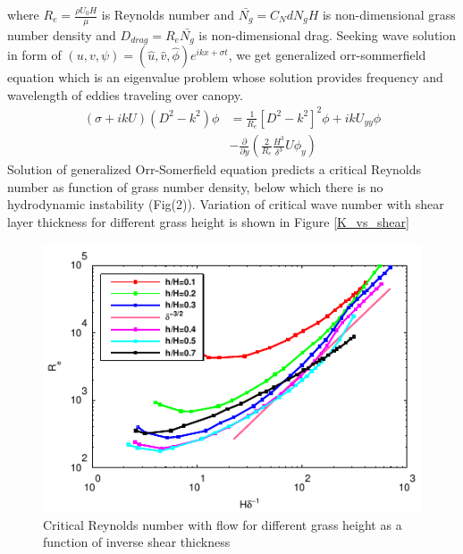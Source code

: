 \documentclass[aps,prl,twocolumn,showpacs,superscriptaddress,groupedaddress,10pt]{revtex4-1}  %
\newcommand{\del}{\partial}
\begin{document}
where $R_{e}= \frac{\rho U_0 H}{\mu}$ is Reynolds number and $\bar{N_g} = C_N d N_g H$ is non-dimensional grass number density and  $D_{drag} = R_{e}\bar{N_{g}}$ is 
non-dimensional drag. Seeking wave solution in form of $\left(u,v,\psi \right)= \left(\hat u, \hat v, \hat\phi \right)e^{ikx+\sigma t}$, we get generalized orr-sommerfield equation 
which is an eigenvalue problem whose solution provides frequency and wavelength of eddies traveling over canopy.
\small
\begin{equation}
\begin{split}
\left(\sigma+ikU\right) \left(D^2-k^2\right)\phi &= \frac{1}{R_{e}}\left[D^2 -k^{2} \right]^2\phi +ikU_{yy}\phi \\
&-\frac{\del}{\del y}\left(\frac{2}{R_e}\frac{H^3}{\delta^3}U\phi_y\right)
\label{Orr-somerfield}
\end{split}
\end{equation}
\normalsize
Solution of generalized Orr-Somerfield equation predicts a critical Reynolds number as function of grass number density, below which there is no hydrodynamic instability (Fig(2)).
Variation of critical wave number with shear layer thickness for different grass height is shown in Figure \ref{K_vs_shear}
\begin{figure}[htb]
\includegraphics[]{Critical_Re_vs_delta}
\caption{Critical Reynolds number with flow for different grass height as a function of inverse shear thickness}
\end{figure}
\end{document}
